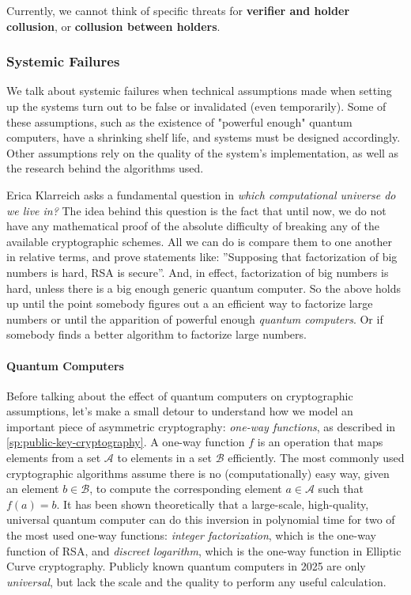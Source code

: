 Currently, we cannot think of specific threats for \textbf{verifier and holder collusion},
or \textbf{collusion between holders}.

\subsubsection{Systemic Failures}

We talk about systemic failures when technical assumptions made when setting up the systems turn out to be false or invalidated (even temporarily).
Some of these assumptions, such as the existence of "powerful enough" quantum computers, have a shrinking shelf life, and systems must be designed accordingly.
Other assumptions rely on the quality of the system's implementation, as well as
the research behind the algorithms used.

Erica Klarreich asks a fundamental question in \emph{which computational universe do we live in?}\cite{KlarUniverse22}
The idea behind this question is the fact that until now, we do not have any mathematical proof of the absolute difficulty
of breaking any of the available cryptographic schemes.
All we can do is compare them to one another in relative terms, and prove statements like: 
''Supposing that factorization of big numbers is hard, RSA is secure''.
And, in effect, factorization of big numbers is hard, unless there is a big enough generic quantum computer.
So the above holds up until the point somebody figures out a an efficient way to factorize large numbers or until the apparition of powerful enough \emph{quantum computers}.
Or if somebody finds a better algorithm to factorize large numbers. 

\paragraph{Quantum Computers}

Before talking about the effect of quantum computers on cryptographic assumptions, let's make a small detour to understand how we model an important piece of asymmetric cryptography: \emph{one-way functions}, as described in
\ref{sp:public-key-cryptography}.
A one-way function $f$ is an operation that maps elements from a set $\mathcal{A}$ to elements in a set $\mathcal{B}$ efficiently. The most commonly used cryptographic algorithms assume there is no (computationally) easy way, given an element $b \in \mathcal{B}$, to compute the corresponding element $a \in \mathcal{A}$ such that $f(a) = b$.
It has been shown theoretically that a large-scale, high-quality, universal
quantum computer \cite[s. 2.1]{TaurusQuantum23} can do this inversion in polynomial time for two of the most used one-way functions: 
\emph{integer factorization}, which is the one-way function of RSA, 
and \emph{discreet logarithm}, which is the one-way function in Elliptic Curve cryptography.
Publicly known quantum computers in 2025 are only \emph{universal}, but lack
the scale and the quality to perform any useful calculation.

